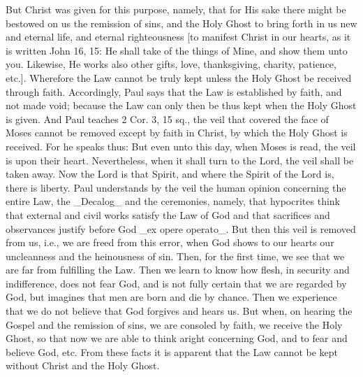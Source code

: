 But Christ was given for this purpose, namely, that for His sake
there might be bestowed on us the remission of sins, and the Holy
Ghost to bring forth in us new and eternal life, and eternal
righteousness [to manifest Christ in our hearts, as it is written
John 16, 15: He shall take of the things of Mine, and show them unto
you.  Likewise, He works also other gifts, love, thanksgiving,
charity, patience, etc.].  Wherefore the Law cannot be truly kept
unless the Holy Ghost be received through faith.  Accordingly, Paul
says that the Law is established by faith, and not made void; because
the Law can only then be thus kept when the Holy Ghost is given.  And
Paul teaches 2 Cor. 3, 15 sq., the veil that covered the face of
Moses cannot be removed except by faith in Christ, by which the Holy
Ghost is received.  For he speaks thus: But even unto this day, when
Moses is read, the veil is upon their heart.  Nevertheless, when it
shall turn to the Lord, the veil shall be taken away.  Now the Lord
is that Spirit, and where the Spirit of the Lord is, there is liberty.
Paul understands by the veil the human opinion concerning the
entire Law, the _Decalog_ and the ceremonies, namely, that hypocrites
think that external and civil works satisfy the Law of God and that
sacrifices and observances justify before God _ex opere operato_.
But then this veil is removed from us, i.e., we are freed from this
error, when God shows to our hearts our uncleanness and the
heinousness of sin.  Then, for the first time, we see that we are far
from fulfilling the Law.  Then we learn to know how flesh, in
security and indifference, does not fear God, and is not fully
certain that we are regarded by God, but imagines that men are born
and die by chance.  Then we experience that we do not believe that
God forgives and hears us.  But when, on hearing the Gospel and the
remission of sins, we are consoled by faith, we receive the Holy
Ghost, so that now we are able to think aright concerning God, and to
fear and believe God, etc. From these facts it is apparent that the
Law cannot be kept without Christ and the Holy Ghost.

